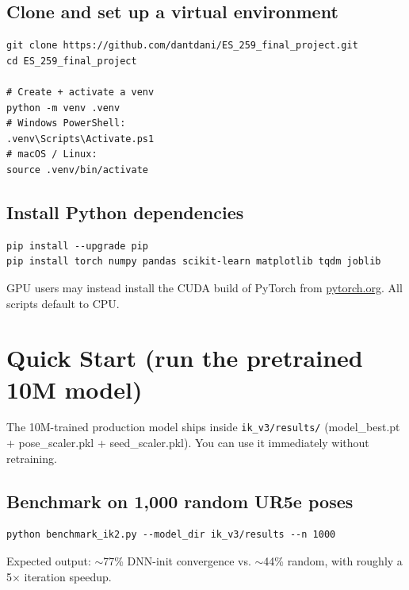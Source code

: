 \documentclass[11pt]{article}
\begin{document}
\subsection{Clone and set up a virtual environment}

\begin{lstlisting}[style=shell]
git clone https://github.com/dantdani/ES_259_final_project.git
cd ES_259_final_project

# Create + activate a venv
python -m venv .venv
# Windows PowerShell:
.venv\Scripts\Activate.ps1
# macOS / Linux:
source .venv/bin/activate
\end{lstlisting}

\subsection{Install Python dependencies}

\begin{lstlisting}[style=shell]
pip install --upgrade pip
pip install torch numpy pandas scikit-learn matplotlib tqdm joblib
\end{lstlisting}

\noindent
GPU users may instead install the CUDA build of PyTorch from
\href{https://pytorch.org/get-started/locally/}{pytorch.org}. All scripts
default to CPU.

\section{Quick Start (run the pretrained 10M model)}

The 10M-trained production model ships inside \texttt{ik\_v3/results/}
(model\_best.pt + pose\_scaler.pkl + seed\_scaler.pkl). You can use it
immediately without retraining.

\subsection{Benchmark on 1,000 random UR5e poses}

\begin{lstlisting}[style=shell]
python benchmark_ik2.py --model_dir ik_v3/results --n 1000
\end{lstlisting}

\noindent
Expected output: $\sim$77\% DNN-init convergence vs. $\sim$44\% random,
with roughly a 5$\times$ iteration speedup.
\end{document}
